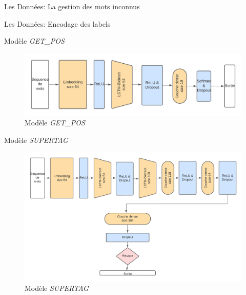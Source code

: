 \documentclass[11pt]{beamer}
\begin{document}
\begin{frame}{Les Données: La gestion des mots inconnus}

\end{frame}

\begin{frame}{Les Données: Encodage des labels}

\end{frame}

\begin{frame}{Modèle \textit{GET\_POS}}
    \begin{figure}
        \centering
        \includegraphics[width=\textwidth]{get_pos.png}
        \caption{Modèle \textit{GET\_POS}}
        \label{fig: model getpos}
    \end{figure} 
\end{frame}

\begin{frame}{Modèle \textit{SUPERTAG}}
    \begin{figure}
        \centering
        \includegraphics[width=\textwidth]{get_morphy_supertag.png}
        \caption{Modèle \textit{SUPERTAG}}
        \label{fig: model supertag}
    \end{figure}
\end{frame}
\end{document}
